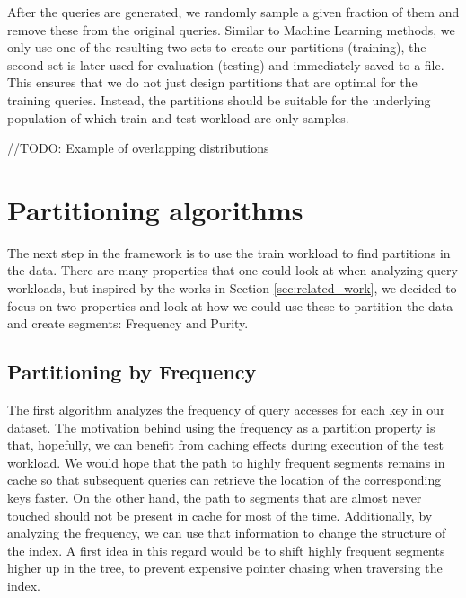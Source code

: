 After the queries are generated, we randomly sample a given fraction of them and remove these from the original queries. Similar to Machine Learning methods, we only use one of the resulting two sets to create our partitions (training), the second set is later used for evaluation (testing) and immediately saved to a file. This ensures that we do not just design partitions that are optimal for the training queries. Instead, the partitions should be suitable for the underlying population of which train and test workload are only samples.

//TODO: Example of overlapping distributions

\section{Partitioning algorithms}
The next step in the framework is to use the train workload to find partitions in the data. There are many properties that one could look at when analyzing query workloads, but inspired by the works in Section \ref{sec:related_work}, we decided to focus on two properties and look at how we could use these to partition the data and create segments: Frequency and Purity.

\subsection{Partitioning by Frequency} \label{sec:frequency}
The first algorithm analyzes the frequency of query accesses for each key in our dataset. The motivation behind using the frequency as a partition property is that, hopefully, we can benefit from caching effects during execution of the test workload. We would hope that the path to highly frequent segments remains in cache so that subsequent queries can retrieve the location of the corresponding keys faster. On the other hand, the path to segments that are almost never touched should not be present in cache for most of the time. Additionally, by analyzing the frequency, we can use that information to change the structure of the index. A first idea in this regard would be to shift highly frequent segments higher up in the tree, to prevent expensive pointer chasing when traversing the index.

